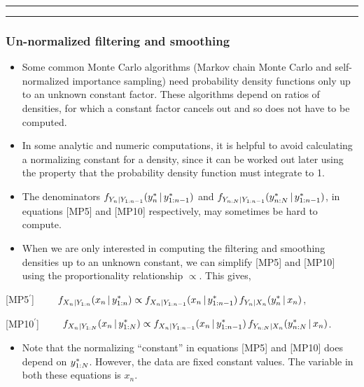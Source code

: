\documentclass[]{article}
\providecommand{\tightlist}{%
  \setlength{\itemsep}{0pt}\setlength{\parskip}{0pt}}
\begin{document}
\begin{center}\rule{0.5\linewidth}{\linethickness}\end{center}

\begin{center}\rule{0.5\linewidth}{\linethickness}\end{center}

\subsubsection{Un-normalized filtering and
smoothing}\label{un-normalized-filtering-and-smoothing}

\begin{itemize}
\item
  Some common Monte Carlo algorithms (Markov chain Monte Carlo and
  self-normalized importance sampling) need probability density
  functions only up to an unknown constant factor. These algorithms
  depend on ratios of densities, for which a constant factor cancels out
  and so does not have to be computed.
\item
  In some analytic and numeric computations, it is helpful to avoid
  calculating a normalizing constant for a density, since it can be
  worked out later using the property that the probability density
  function must integrate to 1.
\item
  The denominators
  \(f_{Y_{n}|Y_{1:n-1}}(y_n^*{\, | \,} y_{1:n-1}^*)\) and
  \(f_{Y_{n:N}|Y_{1:n-1}}(y_{n:N}^*{\, | \,} y_{1:n-1}^*)\), in
  equations {[}MP5{]} and {[}MP10{]} respectively, may sometimes be hard
  to compute.
\item
  When we are only interested in computing the filtering and smoothing
  densities up to an unknown constant, we can simplify {[}MP5{]} and
  {[}MP10{]} using the proportionality relationship \(\propto\). This
  gives,
\end{itemize}

{[}MP5\(^\prime\){]}
\(\quad\quad \displaystyle  f_{X_{n}|Y_{1:n}}(x_{n}{\, | \,} y_{1:n}^*) \propto f_{X_{n}|Y_{1:n-1}}(x_{n}{\, | \,} y_{1:n-1}^*)\, f_{Y_n|X_n}(y_n^*{\, | \,} x_n)\),

{[}MP10\(^\prime\){]}
\(\quad\quad \displaystyle  f_{X_{n}|Y_{1:N}}(x_n{\, | \,} y_{1:N}^*) \propto f_{X_{n}|Y_{1:n-1}}(x_{n}{\, | \,} y_{1:n-1}^*) \, f_{Y_{n:N}|X_{n}}(y_{n:N}^*{\, | \,} x_n)\).

\begin{itemize}
\tightlist
\item
  Note that the normalizing ``constant'' in equations {[}MP5{]} and
  {[}MP10{]} does depend on \(y_{1:N}^*\). However, the data are
  fixed constant values. The variable in both these equations is
  \(x_n\).
\end{itemize}
\end{document}
